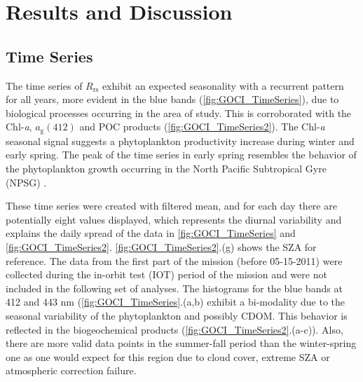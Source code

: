 \documentclass[remotesensing,article,submit,moreauthors,pdftex,10pt,a4paper]{Definitions/mdpi}
\begin{document}
\section{Results and Discussion}
\label{sec:Results}
\subsection{Time Series}\label{subsec:timeseries}
The time series of $R_\text{rs}$ exhibit an expected seasonality with a recurrent pattern for all years, more evident in the blue bands (\autoref{fig:GOCI_TimeSeries}), due to biological processes occurring in the area of study. This is corroborated with the Chl-{\it a}, $a_\text{g}(412)$ and POC products (\autoref{fig:GOCI_TimeSeries2}). The Chl-{\it a} seasonal signal suggests a phytoplankton productivity increase during winter and early spring. The peak of the time series in early spring resembles the behavior of the phytoplankton growth occurring in the North Pacific Subtropical Gyre (NPSG) \cite{Signorini_2015}.

These time series were created with filtered mean, and for each day there are potentially eight values displayed, which represents the diurnal variability and explains the daily spread of the data in \autoref{fig:GOCI_TimeSeries} and \autoref{fig:GOCI_TimeSeries2}. \autoref{fig:GOCI_TimeSeries2}.(g) shows the SZA for reference. The data from the first part of the mission (before 05-15-2011) were collected during the in-orbit test (IOT) period of the mission and were not included in the following set of analyses. The histograms for the blue bands at 412 and 443 nm (\autoref{fig:GOCI_TimeSeries}.(a,b) exhibit a bi-modality due to the seasonal variability of the phytoplankton and possibly CDOM. This behavior is reflected in the biogeochemical products (\autoref{fig:GOCI_TimeSeries2}.(a-c)). Also, there are more valid data points in the summer-fall period than the winter-spring one as one would expect for this region due to cloud cover, extreme SZA or atmospheric correction failure.
\end{document}
